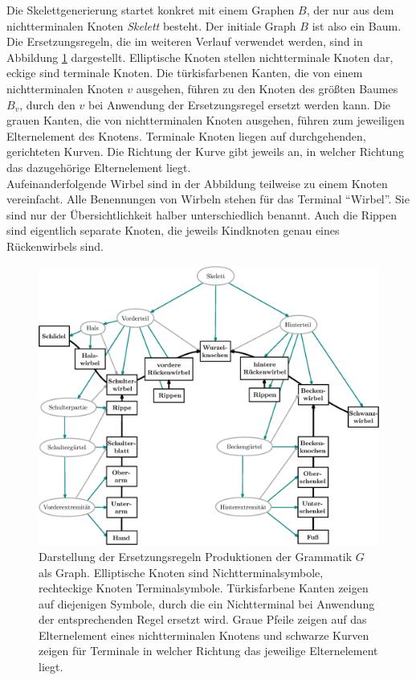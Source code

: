 Die Skelettgenerierung startet konkret mit einem Graphen $B$, der nur aus dem nichtterminalen Knoten \emph{Skelett} besteht. Der initiale Graph $B$ ist also ein Baum.\\
Die Ersetzungsregeln, die im weiteren Verlauf verwendet werden, sind in Abbildung \ref{grammar_graph} dargestellt.
Elliptische Knoten stellen nichtterminale Knoten dar, eckige sind terminale Knoten. Die türkisfarbenen Kanten, die von einem nichtterminalen Knoten $v$ ausgehen, führen zu den Knoten des größten Baumes $B_v$, durch den $v$ bei Anwendung der Ersetzungsregel ersetzt werden kann. Die grauen Kanten, die von nichtterminalen Knoten ausgehen, führen zum jeweiligen Elternelement des Knotens. Terminale Knoten liegen auf durchgehenden, gerichteten Kurven. Die Richtung der Kurve gibt jeweils an, in welcher Richtung das dazugehörige Elternelement liegt.\\
Aufeinanderfolgende Wirbel sind in der Abbildung teilweise zu einem Knoten vereinfacht. Alle Benennungen von Wirbeln stehen für das Terminal "`Wirbel"'. Sie sind nur der Übersichtlichkeit halber unterschiedlich benannt. Auch die Rippen sind eigentlich separate Knoten, die jeweils Kindknoten genau eines Rückenwirbels sind.

 \begin{figure}
  \includegraphics[width=\textwidth]{graphics/grammarGraph}
  \caption{Darstellung der Ersetzungsregeln \bzw Produktionen der Grammatik $G$ als Graph. Elliptische Knoten sind Nichtterminalsymbole, rechteckige Knoten Terminalsymbole. Türkisfarbene Kanten zeigen auf diejenigen Symbole, durch die ein Nichtterminal bei Anwendung der entsprechenden Regel ersetzt wird. Graue Pfeile zeigen auf das Elternelement eines nichtterminalen Knotens und schwarze Kurven zeigen für Terminale in welcher Richtung das jeweilige Elternelement liegt.}
  \label{grammar_graph}
 \end{figure}
 

